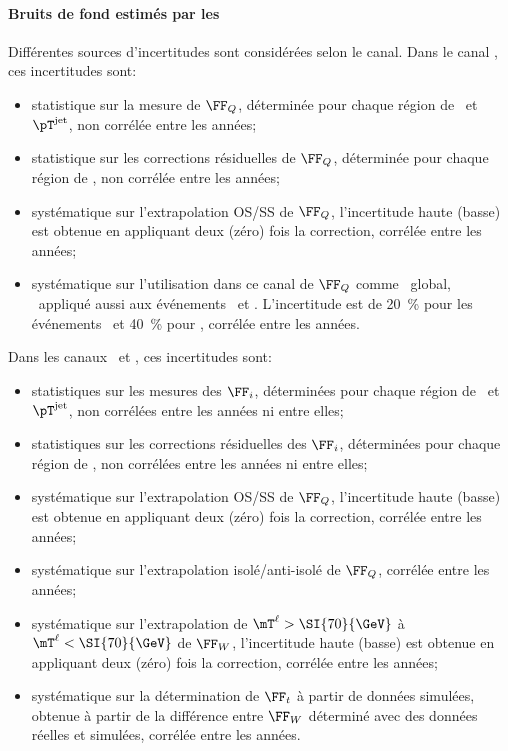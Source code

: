 \paragraph{Bruits de fond estimés par les \fakefactors}
Différentes sources d'incertitudes sont considérées selon le canal.
Dans le canal \tauh\tauh, ces incertitudes sont:
\begin{itemize}
\item statistique sur la mesure de $\FF_Q$, déterminée pour chaque région de \Njets\ et $\pT^{\text{jet}}$, non corrélée entre les années;
\item statistique sur les corrections résiduelles de $\FF_Q$, déterminée pour chaque région de \Njets, non corrélée entre les années;
\item systématique sur l'extrapolation OS/SS de $\FF_Q$, l'incertitude haute (basse) est obtenue en appliquant deux (zéro) fois la correction, corrélée entre les années;
\item systématique sur l'utilisation dans ce canal de $\FF_Q$ comme \FF\ global, \ie\ appliqué aussi aux événements \Wjets\ et \ttbar. L'incertitude est de \SI{20}{\%} pour les événements \Wjets\ et \SI{40}{\%} pour \ttbar, corrélée entre les années.
\end{itemize}
Dans les canaux \mu\tauh\ et \ele\tauh, ces incertitudes sont:
\begin{itemize}
\item statistiques sur les mesures des $\FF_i$, déterminées pour chaque région de \Njets\ et $\pT^{\text{jet}}$, non corrélées entre les années ni entre elles;
\item statistiques sur les corrections résiduelles des $\FF_i$, déterminées pour chaque région de \Njets, non corrélées entre les années ni entre elles;
\item systématique sur l'extrapolation OS/SS de $\FF_Q$, l'incertitude haute (basse) est obtenue en appliquant deux (zéro) fois la correction, corrélée entre les années;
\item systématique sur l'extrapolation isolé/anti-isolé de $\FF_Q$, corrélée entre les années;
\item systématique sur l'extrapolation de $\mT^{\ell}>\SI{70}{\GeV}$ à $\mT^{\ell}<\SI{70}{\GeV}$ de $\FF_W$, l'incertitude haute (basse) est obtenue en appliquant deux (zéro) fois la correction, corrélée entre les années;
\item systématique sur la détermination de $\FF_t$ à partir de données simulées, obtenue à partir de la différence entre $\FF_W$ déterminé avec des données réelles et simulées, corrélée entre les années.
\end{itemize}
